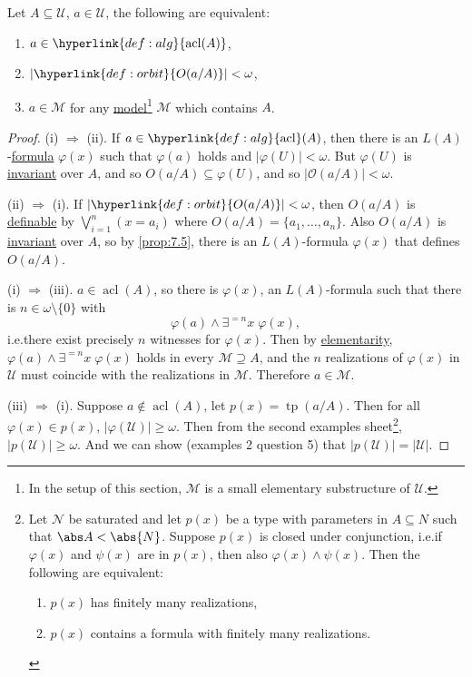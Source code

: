 \documentclass{article}
\DeclareMathOperator{\tp}{tp}
\DeclareMathOperator{\acl}{acl}
\newcommand{\U}{\mathcal{U}}
\begin{document}
\begin{nthm}\label{thm:7.12}
  Let $A \subseteq \U$, $a \in \U$, the following are equivalent:
  \begin{enumerate}[label=(\roman*)]
    \item $a \in \hyperlink{def:alg}{\acl(A)}$,
    \item $|\hyperlink{def:orbit}{O(a/A)}| < \omega$,
    \item $a \in \mathcal{M}$ for any \hyperlink{def:model}{model}\footnote{In the setup of this section, $\mathcal{M}$ is a small elementary substructure of $\mathcal{U}$.} $\mathcal{M}$ which contains $A$.
  \end{enumerate}
\end{nthm}
\begin{proof}
  (i) $\Rightarrow$ (ii). If $a \in \hyperlink{def:alg}{\acl}(A)$, then there is an \hyperlink{def:la}{$L(A)$}-\hyperlink{def:form}{formula} $\varphi(x)$ such that $\varphi(a)$ holds and $|\varphi(U)| < \omega$.
  But $\varphi(U)$ is \hyperlink{def:inv}{invariant} over $A$, and so $O(a/A) \subseteq \varphi(U)$, and so $|\mathcal{O}(a/A)| < \omega$.

  (ii) $\Rightarrow$ (i). If $|\hyperlink{def:orbit}{O(a/A)}| < \omega$, then $O(a/A)$ is \hyperlink{def:def}{definable} by $\bigvee_{i=1}^n (x = a_i)$ where $O(a/A) = \{a_1, \dotsc, a_n\}$.
  Also $O(a/A)$ is \hyperlink{def:inv}{invariant} over $A$, so by \cref{prop:7.5}, there is an $L(A)$-formula $\varphi(x)$ that defines $O(a/A)$.

  (i) $\Rightarrow$ (iii). $a \in \acl(A)$, so there is $\varphi(x)$, an $L(A)$-formula such that there is $n \in \omega\setminus\{0\}$ with
  \begin{equation*}
    \varphi(a) \wedge \exists^{=n} x \; \varphi(x),
  \end{equation*}
  i.e.\@ there exist precisely $n$ witnesses for $\varphi(x)$.
  Then by \hyperlink{def:elmap}{elementarity}, $\varphi(a) \wedge \exists^{=n} x \; \varphi(x)$ holds in every $\mathcal{M} \supseteq A$, and the $n$ realizations of $\varphi(x)$ in $\mathcal{U}$ must coincide with the realizations in $\mathcal{M}$.
  Therefore $a \in \mathcal{M}$.

  (iii) $\Rightarrow$ (i). Suppose $a \notin \acl(A)$, let $p(x) = \tp(a/A)$. Then for all $\varphi(x) \in p(x)$, $|\varphi(\mathcal{U})| \geq \omega$.
  Then from the second examples sheet\footnote{
  Let $\mathcal{N}$ be saturated and let $p(x)$ be a type with parameters in $A \subseteq N$ such that $\abs A < \abs{N}$. Suppose $p(x)$ is closed under conjunction, i.e.\@ if $\varphi(x)$ and $\psi(x)$ are in $p(x)$, then also $\varphi(x) \land \psi(x)$. Then the following are equivalent:
  \begin{enumerate}[label=(\roman*)]
  \item $p(x)$ has finitely many realizations,
  \item $p(x)$ contains a formula with finitely many realizations.
  \end{enumerate}}, $|p(\mathcal{U})| \geq \omega$.
  And we can show (examples 2 question 5) that $|p(\mathcal{U})| = |\mathcal{U}|$.


\end{proof}
\end{document}
